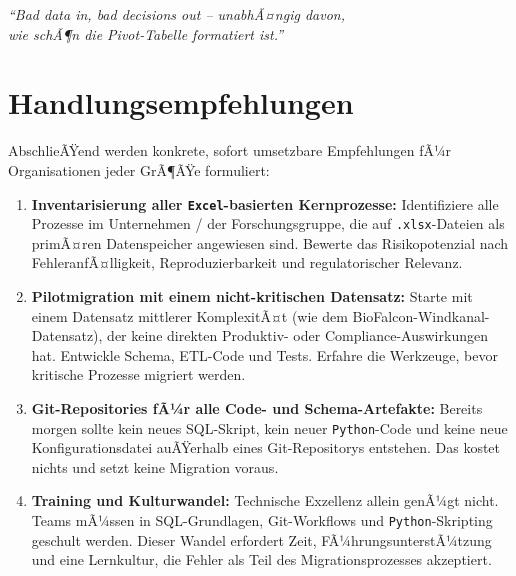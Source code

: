 ﻿\documentclass[12pt,a4paper]{report}
\theoremstyle{definition}
\theoremstyle{remark}
\newcommand{\excel}{\texttt{Excel}}
\newcommand{\py}{\texttt{Python}}
\newcommand{\code}[1]{\texttt{#1}}
\begin{document}
\bigskip
\begin{center}
  {\large\itshape
    ``Bad data in, bad decisions out -- unabhÃ¤ngig davon,\\
    wie schÃ¶n die Pivot-Tabelle formatiert ist.''
  }
\end{center}

\section{Handlungsempfehlungen}

AbschlieÃŸend werden konkrete, sofort umsetzbare Empfehlungen fÃ¼r
Organisationen jeder GrÃ¶ÃŸe formuliert:

\begin{enumerate}[leftmargin=1.5em, itemsep=5pt]
  \item \textbf{Inventarisierung aller \excel-basierten Kernprozesse:}
        Identifiziere alle Prozesse im Unternehmen / der Forschungsgruppe,
        die auf \code{.xlsx}-Dateien als primÃ¤ren Datenspeicher angewiesen
        sind. Bewerte das Risikopotenzial nach FehleranfÃ¤lligkeit,
        Reproduzierbarkeit und regulatorischer Relevanz.

  \item \textbf{Pilotmigration mit einem nicht-kritischen Datensatz:}
        Starte mit einem Datensatz mittlerer KomplexitÃ¤t (wie dem
        BioFalcon-Windkanal-Datensatz), der keine direkten Produktiv-
        oder Compliance-Auswirkungen hat.
        Entwickle Schema, ETL-Code und Tests.
        Erfahre die Werkzeuge, bevor kritische Prozesse migriert werden.

  \item \textbf{Git-Repositories fÃ¼r alle Code- und Schema-Artefakte:}
        Bereits morgen sollte kein neues SQL-Skript, kein neuer
        \py-Code und keine neue Konfigurationsdatei auÃŸerhalb eines
        Git-Repositorys entstehen.
        Das kostet nichts und setzt keine Migration voraus.

  \item \textbf{Training und Kulturwandel:}
        Technische Exzellenz allein genÃ¼gt nicht.
        Teams mÃ¼ssen in SQL-Grundlagen, Git-Workflows und
        \py-Skripting geschult werden.
        Dieser Wandel erfordert Zeit, FÃ¼hrungsunterstÃ¼tzung und eine
        Lernkultur, die Fehler als Teil des Migrationsprozesses akzeptiert.


\end{enumerate}
\end{document}
